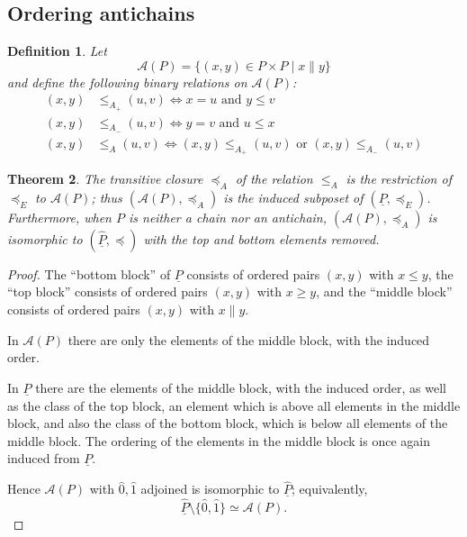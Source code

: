 \documentclass[11pt,a4paper,abstract=yes]{scrartcl}
\theoremstyle{plain}
\newtheorem{theorem}{Theorem}[section]
\newtheorem{definition}[theorem]{Definition}
\newcommand{\transerel}{\preceq_{E}}
\newcommand{\twoanti}[1]{\mathcal{A}({#1})}
\newcommand{\tarel}{\le_{A_+}}
\newcommand{\tbrel}{\le_{A_-}}
\newcommand{\terel}{\le_{A}}
\newcommand{\transterel}{\preceq_{A}}
\newcommand{\Pairs}[1]{\underline{#1}}
\newcommand{\Ppairs}{\Pairs{P}}
\newcommand{\PairsQuotient}[1]{\widehat{\Pairs{#1}}}
\newcommand{\Pqu}{\PairsQuotient{P}}
\newcommand{\pqurel}{\preceq}
\begin{document}
\subsection{Ordering antichains}
\label{sec:org01df65e}
\begin{definition}
Let
\[\twoanti{P} = \{(x,y) \in P \times P \mid x \parallel y\}\]
and define the following binary relations on \(\twoanti{P}\):
\begin{equation}
\label{eq-trel}
  \begin{split}
    (x,y) & \tarel (u,v) \iff x = u \text{ and } y \le v \\
    (x,y) & \tbrel (u,v) \iff y = v \text{ and } u \le x \\
    (x,y) & \terel (u,v) \iff (x,y) \tarel (u,v) \text{ or } (x,y) \tbrel (u,v)
  \end{split}
\end{equation}
\label{def-rel-antichains}
\end{definition}

\begin{theorem}
The transitive closure \(\transterel\) of the relation \(\terel\) is the restriction of \(\transerel\) to \(\twoanti{P}\);
thus \((\twoanti{P}, \transterel)\) is the induced subposet of \((\Ppairs, \transerel)\).
Furthermore, when \(P\) is neither a chain nor an antichain,
\((\twoanti{P},  \transterel)\) is isomorphic to \((\Pqu,\pqurel)\) with the top and bottom elements removed.
\label{thm-induced}
\end{theorem}
\begin{proof}
The ``bottom block'' of \(\Ppairs\) consists of ordered pairs \((x,y)\) with \(x \le y\),
the ``top block''  consists of ordered pairs \((x,y)\) with \(x \ge y\),
and the ``middle block''  consists of ordered pairs \((x,y)\) with \(x \parallel y\).

In \(\twoanti{P}\) there are only the elements of the middle block, with the induced order.

In \(\Pqu\) there are the elements of the middle block, with the induced order,
as well as the class of the top block, an element which is above all elements in the middle block,
and also the class of the bottom block, which is below all elements of the middle block.
The ordering of the elements in the middle block is once again induced from \(\Ppairs\).

Hence \(\twoanti{P}\) with \(\hat{0},\hat{1}\) adjoined is isomorphic to \(\Pqu\);
equivalently,
\[\Pqu \setminus \{\hat{0}, \hat{1}\} \simeq \twoanti{P}.\]
\end{proof}
\end{document}
